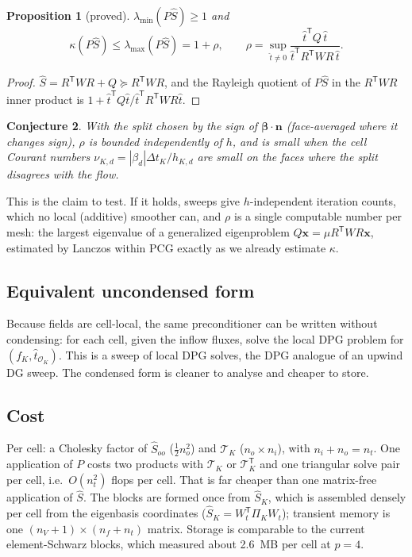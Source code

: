 \documentclass[11pt]{article}
\newtheorem{proposition}{Proposition}
\newtheorem{conjecture}[proposition]{Conjecture}
\theoremstyle{remark}
\theoremstyle{definition}
\newcommand{\bbeta}{\boldsymbol{\beta}}
\newcommand{\bn}{\boldsymbol{n}}
\newcommand{\that}{\hat{t}}
\newcommand{\Shat}{\widehat{S}}
\newcommand{\T}{\mathsf{T}}
\newcommand{\Tr}{\mathcal{T}}
\begin{document}
\begin{proposition}[proved]\label{prop:bound}
$\lambda_{\min}(P\Shat)\ge1$ and
\[
  \kappa(P\Shat)\le\lambda_{\max}(P\Shat) = 1+\rho,\qquad
  \rho = \sup_{\that\ne0}\frac{\that^\T Q\,\that}{\that^\T R^\T WR\,\that}.
\]
\end{proposition}
\begin{proof}
$\Shat = R^\T WR + Q\succeq R^\T WR$, and the Rayleigh quotient of $P\Shat$ in the $R^\T WR$ inner product is
$1+\that^\T Q\that/\that^\T R^\T WR\that$.
\end{proof}

\begin{conjecture}\label{conj:rho}
With the split chosen by the sign of $\bbeta\cdot\bn$ (face-averaged where it changes sign), $\rho$ is bounded
independently of $h$, and is small when the cell Courant numbers $\nu_{K,d}=|\beta_d|\Delta t_K/h_{K,d}$ are small
on the faces where the split disagrees with the flow.
\end{conjecture}

This is the claim to test.  If it holds, sweeps give $h$-independent iteration counts, which no local (additive)
smoother can, and $\rho$ is a single computable number per mesh: the largest eigenvalue of a generalized eigenproblem
$Q\mathbf x=\mu R^\T WR\mathbf x$, estimated by Lanczos within PCG exactly as we already estimate $\kappa$.

\subsection{Equivalent uncondensed form}

Because fields are cell-local, the same preconditioner can be written without condensing: for each cell, given the
inflow fluxes, solve the local DPG problem for $(f_K,\that_{\mathcal O_K})$.  This is a sweep of local DPG solves,
the DPG analogue of an upwind DG sweep.  The condensed form is cleaner to analyse and cheaper to store.

\subsection{Cost}

Per cell: a Cholesky factor of $\Shat_{oo}$ ($\tfrac12 n_o^2$) and $\Tr_K$ ($n_o\times n_i$), with $n_i+n_o=n_t$.  One
application of $P$ costs two products with $\Tr_K$ or $\Tr_K^\T$ and one triangular solve pair per cell, i.e.\
$O(n_t^2)$ flops per cell.  That is far cheaper than one matrix-free application of $\Shat$.  The blocks are formed
once from $\Shat_K$, which is assembled densely per cell from the eigenbasis coordinates
($\Shat_K=W_t^\T\Pi_KW_t$); transient memory is one $(n_V+1)\times(n_f+n_t)$ matrix.  Storage is comparable to the
current element-Schwarz blocks, which measured about 2.6~MB per cell at $p=4$.
\end{document}
